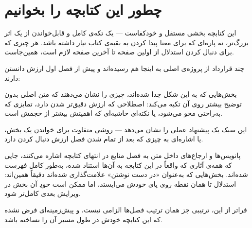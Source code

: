 \chapter*{چطور این کتابچه را بخوانیم}

این کتابچه بخشی مستقل و خودکفاست --- یک تکه‌ی کامل و قابل‌خواندن از
یک اثر بزرگ‌تر، نه پاره‌ای که برای معنا پیدا کردن به بقیه‌ی کتاب نیاز
داشته باشد. هر چیزی که برای دنبال کردن استدلال از اولین صفحه تا آخرین
صفحه لازم است، همین‌جاست.

چند قرارداد از پروژه‌ی اصلی به اینجا هم رسیده‌اند و پیش از فصل اول
ارزش دانستن دارند:

\begin{notebox}[title=یادداشت]
بخش‌هایی که به این شکل جدا شده‌اند، چیزی را نشان می‌دهند که متن اصلی
بدون توضیح بیشتر روی آن تکیه می‌کند: اصطلاحی که ارزش دقیق‌تر شدن دارد،
تمایزی که به‌راحتی محو می‌شود، یا نکته‌ای حاشیه‌ای که اهمیتش بیشتر از
حجمش است.
\end{notebox}

\begin{tipbox}[title=نکته]
این سبک یک پیشنهاد عملی را نشان می‌دهد --- روشی متفاوت برای خواندن یک
بخش، یا اشاره‌ای به چیزی که بعد از تمام شدن فصل ارزش دنبال کردن دارد.
\end{tipbox}

پانویس‌ها و ارجاع‌های داخل متن به فصل منابع در انتهای کتابچه اشاره
می‌کنند، جایی که همه‌ی آثاری که واقعاً در این کتابچه به آن‌ها استناد
شده، به‌طور کامل فهرست شده‌اند. بخش‌هایی که به‌عنوان «در دست نوشتن»
علامت‌گذاری شده‌اند دقیقاً همین‌اند: استدلال تا همان نقطه روی پای خودش
می‌ایستد، اما ممکن است خودِ آن بخش در ویرایش بعدی کامل‌تر شود.

فراتر از این، ترتیبی جز همان ترتیب فصل‌ها الزامی نیست، و پیش‌زمینه‌ای
فرض نشده که این کتابچه خودش در طول مسیر آن را نساخته باشد.
